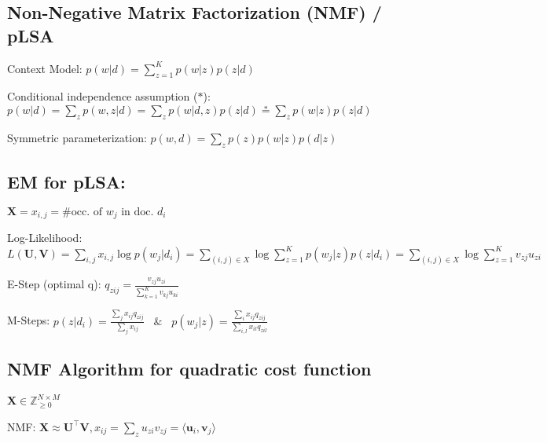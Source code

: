 \documentclass[a4paper, 11pt, landscape]{article}
\begin{document}
\begin{multicols*}{3}
    \section{Non-Negative Matrix Factorization (NMF) / pLSA}
    \begin{compactdesc}
    \item[Context Model:] $p(w | d) = \sum_{z=1}^K p(w | z) p(z | d)$
    \item[Conditional independence assumption ($*$):] $p(w|d) = \sum_z p(w,z|d) = \sum_z p(w|d,z)p(z|d) \stackrel{*}{=} \sum_z p(w|z)p(z|d)$ 
    \item[Symmetric parameterization:] $p(w, d) = \sum_z p(z)p(w | z) p(d | z)$
    \end{compactdesc}

    \subsection{EM for pLSA:}
    \begin{compactenum}
    \item $\mathbf{X} = x_{i,j} = \text{\# occ.\ of $w_j$ in doc. $d_i$}$
    \item Log-Likelihood: $L(\mathbf{U}, \mathbf{V}) 
        = \sum_{i,j} x_{i,j}\log p(w_j|d_i) 
        = \sum_{(i,j) \in X} \log \sum_{z=1}^K p(w_j|z)p(z|d_i)
        = \sum_{(i,j) \in X} \log \sum_{z=1}^K v_{zj}u_{zi}
        $
    \item E-Step (optimal q): $q_{zij} = \frac{v_{zj}u_{zi}}{\sum_{k=1}^K v_{kj}u_{ki}}$
    \item M-Steps: $p(z|d_i) = \frac{\sum_j x_{ij}q_{zij}}{\sum_j x_{ij}}\hspace{10pt}\&\hspace{10pt} p(w_j|z) = \frac{\sum_i x_{ij}q_{zij}}{\sum_{i,l}x_{il}q_{zil}}$
    \end{compactenum}

    \subsection{NMF Algorithm for quadratic cost function}
    \begin{inparaitem}[\color{red}\textbullet]
    \item $\mathbf{X} \in \mathbb{Z}^{N \times M}_{\geq 0}$
    \item NMF: $\mathbf{X} \approx \mathbf{U^\top V}, x_{ij} = \sum_z u_{zi}v_{zj} = \langle \mathbf{u}_i, \mathbf{v}_j \rangle$
    \end{inparaitem}


\end{multicols*}
\end{document}
